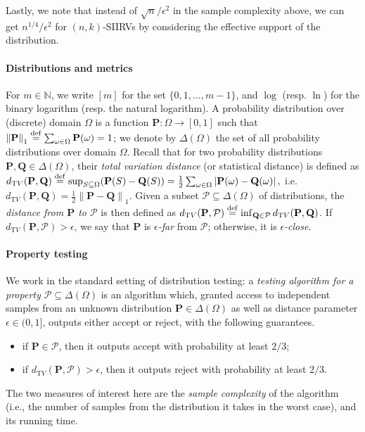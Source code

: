 \documentclass[11pt]{article}
\makeatletter
\renewcommand{\section}{\@startsection{section}{1}{0pt}{-12pt}{5pt}{\large\bf}}
\theoremstyle{definition}
\newcommand{\N}{\mathbb{N}}
\newcommand{\p}{\mathbf{P}}
\newcommand{\q}{\mathbf{Q}}
\newcommand{\dtv}{d_{\mathrm TV}}
\newcommand{\eps}{\epsilon}
\newcommand{\abs}[1]{\lvert#1\rvert}
\newcommand{\norm}[1]{\lVert#1\rVert}
\newcommand{\eqdef}{\stackrel{{\mathrm {\footnotesize def}}}{=}}
\newcommand{\distribs}[1]{\Delta\!\left(#1\right)} \newcommand{\normone}[1]{{\norm{#1}}_1}
\renewcommand{\abs}[1]{\left\lvert #1 \right\rvert}
\newcommand{\accept}{\textsf{accept}\xspace}
\newcommand{\reject}{\textsf{reject}\xspace}
\makeatother
\begin{document}
Lastly, we note that instead of $\sqrt{n}/\eps^2$ in the sample complexity above, we can get $n^{1/4}/\eps^2$ for $(n,k)$-SIIRVs by considering the effective support of the distribution.





 
\section{Preliminaries} \label{sec:prelim}
\paragraph{Distributions and metrics} 
For $m \in \N$, we write $[m]$ for the set $\{0,1,\dots,m-1\}$, and $\log$ (resp. $\ln$) for the binary logarithm (resp. the natural logarithm). A probability distribution over (discrete) domain $\Omega$ is a function $\p\colon\Omega\to[0,1]$ such that $\normone{\p}\eqdef \sum_{\omega\in\Omega}\p(\omega)=1$; we denote by $\distribs{\Omega}$ the set of all probability distributions over domain $\Omega$. 
Recall that for two probability distributions $\p,\q\in\distribs{\Omega}$, their \emph{total variation distance} (or statistical distance) is defined as 
$
    \dtv(\p,\q) \eqdef \sup_{S\subseteq\Omega} (\p(S)-\q(S)) = \frac{1}{2}\sum_{\omega\in\Omega} \abs{\p(\omega)-\q(\omega)},
$
i.e. $\dtv(\p,\q) = \frac{1}{2}\normone{\p-\q}$. Given a subset $\mathcal{P}\subseteq \distribs{\Omega}$ of distributions, the \emph{distance from $\p$ to $\mathcal{P}$} is then defined as $\dtv(\p,\mathcal{P})\eqdef \inf_{\q\in\mathcal{P}} \dtv(\p,\q)$. If $\dtv(\p,\mathcal{P}) > \eps$, we say that $\p$ is \emph{$\eps$-far} from $\mathcal{P}$; otherwise, it is \emph{$\eps$-close}.

\paragraph*{Property testing}
We work in the standard setting of distribution testing: a \emph{testing algorithm for a property $\mathcal{P}\subseteq\distribs{\Omega}$} is an algorithm which, granted access to independent samples from an unknown distribution $\p\in\distribs{\Omega}$ as well as distance parameter $\eps\in(0,1]$, outputs either \accept or \reject, with the following guarantees.
\begin{itemize}
  \item if $\p\in\mathcal{P}$, then it outputs \accept with probability at least $2/3$;
  \item if $\dtv(\p,\mathcal{P})>\eps$, then it outputs \reject with probability at least $2/3$.
\end{itemize}
The two measures of interest here are the \emph{sample complexity} of the algorithm (i.e., the number of samples from the distribution it takes in the worst case), and its running time.
\end{document}

